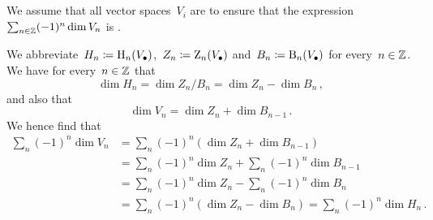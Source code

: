 \section{}
We assume that all vector spaces~$V_i$ are {\fd} to ensure that the expression~$\sum_{n \in \mathbb{Z}} (-1)^n \dim V_n$ is {\welldef}.

We abbreviate~$H_n \coloneqq \operatorname{H}_n(V_\bullet)$,~$Z_n \coloneqq \operatorname{Z}_n(V_\bullet)$ and~$B_n \coloneqq \operatorname{B}_n(V_\bullet)$ for every~$n \in \mathbb{Z}$.
We have for every~$n \in \mathbb{Z}$ that
\[
    \dim H_n
  = \dim Z_n/B_n
  = \dim Z_n - \dim B_n \,,
\]
and also that
\[
    \dim V_n
  = \dim Z_n + \dim B_{n-1} \,.
\]
We hence find that
\begin{align*}
      \sum_n (-1)^n \dim V_n
  &=  \sum_n (-1)^n (\dim Z_n + \dim B_{n-1}) \\
  &=  \sum_n (-1)^n \dim Z_n + \sum_n (-1)^n \dim B_{n-1} \\
  &=  \sum_n (-1)^n \dim Z_n - \sum_n (-1)^n \dim B_n \\
  &=  \sum_n (-1)^n (\dim Z_n - \dim B_n)
   =  \sum_n (-1)^n \dim H_n \,.
\end{align*}





